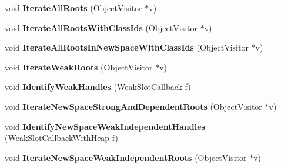 \begin{DoxyCompactItemize}
\item 
\hypertarget{classv8_1_1internal_1_1_global_handles_a1e2bee589562848cc6612b8764946ae6}{}void {\bfseries Iterate\+All\+Roots} (Object\+Visitor $\ast$v)\label{classv8_1_1internal_1_1_global_handles_a1e2bee589562848cc6612b8764946ae6}

\item 
\hypertarget{classv8_1_1internal_1_1_global_handles_a6fd1a5b22e2bcd0ecb38b1472edc396b}{}void {\bfseries Iterate\+All\+Roots\+With\+Class\+Ids} (Object\+Visitor $\ast$v)\label{classv8_1_1internal_1_1_global_handles_a6fd1a5b22e2bcd0ecb38b1472edc396b}

\item 
\hypertarget{classv8_1_1internal_1_1_global_handles_a1d32005a16121ad732832c0e5fb04829}{}void {\bfseries Iterate\+All\+Roots\+In\+New\+Space\+With\+Class\+Ids} (Object\+Visitor $\ast$v)\label{classv8_1_1internal_1_1_global_handles_a1d32005a16121ad732832c0e5fb04829}

\item 
\hypertarget{classv8_1_1internal_1_1_global_handles_af7c5a6ae9af4f86ddd3288c000a447c9}{}void {\bfseries Iterate\+Weak\+Roots} (Object\+Visitor $\ast$v)\label{classv8_1_1internal_1_1_global_handles_af7c5a6ae9af4f86ddd3288c000a447c9}

\item 
\hypertarget{classv8_1_1internal_1_1_global_handles_ac3fff0215793e5709141755b9195a38c}{}void {\bfseries Identify\+Weak\+Handles} (Weak\+Slot\+Callback f)\label{classv8_1_1internal_1_1_global_handles_ac3fff0215793e5709141755b9195a38c}

\item 
\hypertarget{classv8_1_1internal_1_1_global_handles_a561e082207845938b4c552ac48e6e5f1}{}void {\bfseries Iterate\+New\+Space\+Strong\+And\+Dependent\+Roots} (Object\+Visitor $\ast$v)\label{classv8_1_1internal_1_1_global_handles_a561e082207845938b4c552ac48e6e5f1}

\item 
\hypertarget{classv8_1_1internal_1_1_global_handles_a863e33bb5a55dafda78a486babb6b69c}{}void {\bfseries Identify\+New\+Space\+Weak\+Independent\+Handles} (Weak\+Slot\+Callback\+With\+Heap f)\label{classv8_1_1internal_1_1_global_handles_a863e33bb5a55dafda78a486babb6b69c}

\item 
\hypertarget{classv8_1_1internal_1_1_global_handles_a2adb59e8962c02691b071d772a3f7b74}{}void {\bfseries Iterate\+New\+Space\+Weak\+Independent\+Roots} (Object\+Visitor $\ast$v)\label{classv8_1_1internal_1_1_global_handles_a2adb59e8962c02691b071d772a3f7b74}


\end{DoxyCompactItemize}
